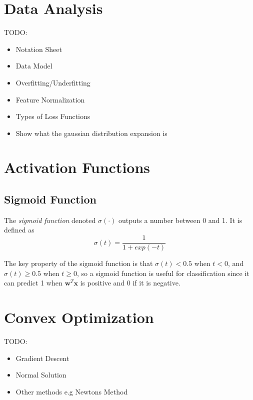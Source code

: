 \documentclass[12pt]{article}
\begin{document}
\newpage

\section{Data Analysis}
TODO:
\begin{itemize}
    \item Notation Sheet
    \item Data Model
    \item Overfitting/Underfitting
    \item Feature Normalization
    \item Types of Loss Functions
    \item Show what the gaussian distribution expansion is
\end{itemize}

\section{Activation Functions}
    \subsection{Sigmoid Function}
        The \textit{sigmoid function} denoted $\sigma(\cdot)$ outputs a number between 0 and 1. It is defined as
        $$ \sigma(t) = \frac{1}{1 + exp(-t)} $$


        The key property of the sigmoid function is that $\sigma(t) < 0.5$ when $t < 0$, and $\sigma(t) \geq 0.5$ when $t \geq 0$, so a sigmoid function is useful for classification since it can predict 1 when $\boldsymbol{w}^T\boldsymbol{x}$
        is positive and 0 if it is negative.

\section{Convex Optimization}
    TODO:
    \begin{itemize}
        \item Gradient Descent
        \item Normal Solution
        \item Other methods e.g Newtons Method
    \end{itemize}
\end{document}
